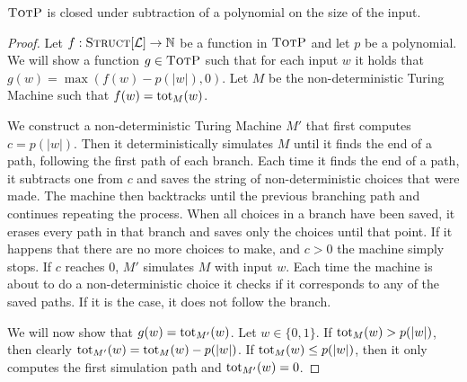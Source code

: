 \begin{theo}
	$\textsc{TotP}$ is closed under subtraction of a polynomial on the size of the input.
\end{theo}
\begin{proof}
	Let $f:\textsc{Struct}[{\cal L}]\to\mathbb{N}$ be a function in $\textsc{TotP}$ and let $p$ be a polynomial. We will show a function $g\in\textsc{TotP}$ such that for each input $w$ it holds that $g(w) = \max(f(w) - p(\vert w \vert),0)$. Let $M$ be the non-deterministic Turing Machine such that $f(w) = \text{tot}_M(w)$. 
	
	We construct a non-deterministic Turing Machine $M'$ that first computes $c = p(\vert w \vert)$. Then it deterministically simulates $M$ until it finds the end of a path, following the first path of each branch. Each time it finds the end of a path, it subtracts one from $c$ and saves the string of non-deterministic choices that were made. The machine then backtracks until the previous branching path and continues repeating the process. When all choices in a branch have been saved, it erases every path in that branch and saves only the choices until that point. If it happens that there are no more choices to make, and $c > 0$ the machine simply stops. If $c$ reaches 0, $M'$ simulates $M$ with input $w$. Each time the machine is about to do a non-deterministic choice it checks if it corresponds to any of the saved paths. If it is the case, it does not follow the branch.
	
	We will now show that $g(w) = \text{tot}_{M'}(w)$. Let $w\in\{0,1\}$. If $\text{tot}_{M}(w) > p(\vert w \vert)$, then clearly $\text{tot}_{M'}(w) = \text{tot}_{M}(w) - p(\vert w \vert)$. If $\text{tot}_{M}(w) \leq p(\vert w \vert)$, then it only computes the first simulation path and $\text{tot}_{M'}(w) = 0$.
\end{proof}